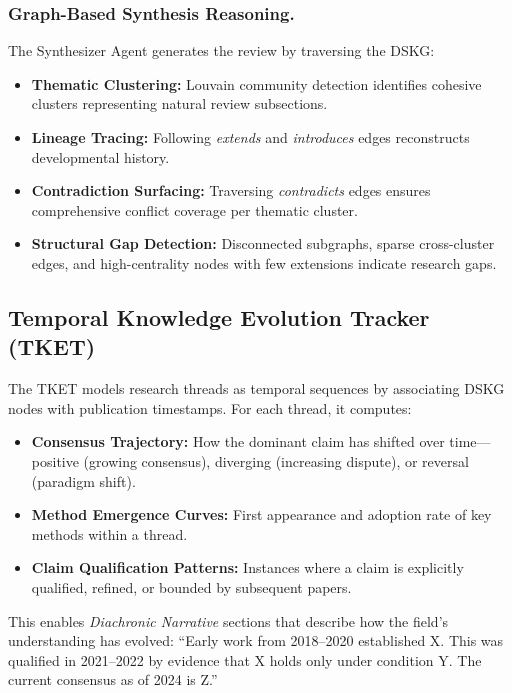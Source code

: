 \subsubsection{Graph-Based Synthesis Reasoning.}
The Synthesizer Agent generates the review by traversing the DSKG:
\begin{itemize}
    \item \textbf{Thematic Clustering:} Louvain community detection identifies cohesive clusters representing natural review subsections.
    \item \textbf{Lineage Tracing:} Following \emph{extends} and \emph{introduces} edges reconstructs developmental history.
    \item \textbf{Contradiction Surfacing:} Traversing \emph{contradicts} edges ensures comprehensive conflict coverage per thematic cluster.
    \item \textbf{Structural Gap Detection:} Disconnected subgraphs, sparse cross-cluster edges, and high-centrality nodes with few extensions indicate research gaps.
\end{itemize}

\subsection{Temporal Knowledge Evolution Tracker (TKET)}

The TKET models research threads as temporal sequences by associating DSKG nodes with publication timestamps. For each thread, it computes:

\begin{itemize}
    \item \textbf{Consensus Trajectory:} How the dominant claim has shifted over time---positive (growing consensus), diverging (increasing dispute), or reversal (paradigm shift).
    \item \textbf{Method Emergence Curves:} First appearance and adoption rate of key methods within a thread.
    \item \textbf{Claim Qualification Patterns:} Instances where a claim is explicitly qualified, refined, or bounded by subsequent papers.
\end{itemize}

This enables \emph{Diachronic Narrative} sections that describe how the field's understanding has evolved: ``Early work from 2018--2020 established X. This was qualified in 2021--2022 by evidence that X holds only under condition Y. The current consensus as of 2024 is Z.''

